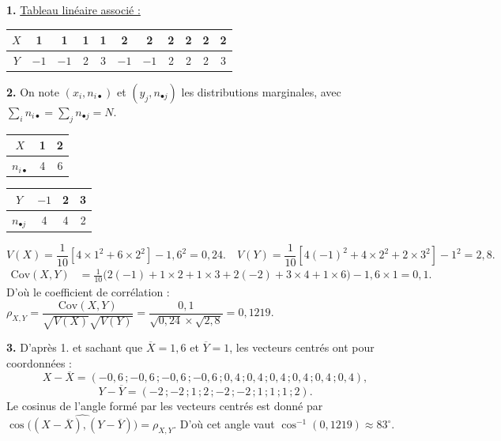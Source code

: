 \documentclass[11pt]{article}
\begin{document}

\textbf{1.} \underline{Tableau linéaire associé :}
\begin{center}\renewcommand{\arraystretch}{1.3}\setlength{\tabcolsep}{4pt}
\begin{tabular}{|c|*{10}{c|}}
\hline
$X$ & 1 & 1 & 1 & 1 & 2 & 2 & 2 & 2 & 2 & 2 \\
\hline
$Y$ & $-1$ & $-1$ & 2 & 3 & $-1$ & $-1$ & 2 & 2 & 2 & 3 \\
\hline
\end{tabular}
\end{center}

\textbf{2.} On note $(x_i, n_{i\bullet})$ et $(y_j, n_{\bullet j})$ les distributions marginales, avec $\sum_i n_{i\bullet} = \sum_j n_{\bullet j} = N$.
\begin{center}\renewcommand{\arraystretch}{1.3}
\begin{tabular}{|c|c|c|}\hline $X$ & 1 & 2 \\\hline $n_{i\bullet}$ & 4 & 6 \\\hline\end{tabular}
\qquad
\begin{tabular}{|c|c|c|c|}\hline $Y$ & $-1$ & 2 & 3 \\\hline $n_{\bullet j}$ & 4 & 4 & 2 \\\hline\end{tabular}
\end{center}
\[ V(X) = \frac{1}{10}\left[4 \times 1^2 + 6 \times 2^2\right] - 1{,}6^2 = 0{,}24. \quad V(Y) = \frac{1}{10}\left[4(-1)^2 + 4 \times 2^2 + 2 \times 3^2\right] - 1^2 = 2{,}8. \]
\begin{align*}
\mathrm{Cov}(X, Y) &= \frac{1}{10}\big(2(-1) + 1 \times 2 + 1 \times 3 + 2(-2) + 3 \times 4 + 1 \times 6\big) - 1{,}6 \times 1 = 0{,}1.
\end{align*}
D'où le coefficient de corrélation : $\rho_{X,Y} = \dfrac{\mathrm{Cov}(X, Y)}{\sqrt{V(X)}\sqrt{V(Y)}} = \dfrac{0{,}1}{\sqrt{0{,}24} \times \sqrt{2{,}8}} = 0{,}1219$.

\textbf{3.} D'après 1. et sachant que $\overline{X} = 1{,}6$ et $\overline{Y} = 1$, les vecteurs centrés ont pour coordonnées :
\[ X - \overline{X} = (-0{,}6\,;-0{,}6\,;-0{,}6\,;-0{,}6\,;0{,}4\,;0{,}4\,;0{,}4\,;0{,}4\,;0{,}4\,;0{,}4), \]
\[ Y - \overline{Y} = (-2\,;-2\,;1\,;2\,;-2\,;-2\,;1\,;1\,;1\,;2). \]
Le cosinus de l'angle formé par les vecteurs centrés est donné par $\cos\big(\widehat{(X - \overline{X}),(Y - \overline{Y})}\big) = \rho_{X,Y}$. D'où cet angle vaut $\cos^{-1}(0{,}1219) \approx 83^\circ$.
\end{document}
